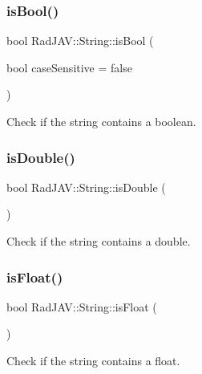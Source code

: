 \subsubsection{\texorpdfstring{is\+Bool()}{isBool()}}
{\footnotesize\ttfamily bool Rad\+J\+A\+V\+::\+String\+::is\+Bool (\begin{DoxyParamCaption}\item[{bool}]{case\+Sensitive = {\ttfamily false} }\end{DoxyParamCaption})}



Check if the string contains a boolean. 

\mbox{\label{class_rad_j_a_v_1_1_string_a51e463c671c993ce10184f68dac050d0}} 
\subsubsection{\texorpdfstring{is\+Double()}{isDouble()}}
{\footnotesize\ttfamily bool Rad\+J\+A\+V\+::\+String\+::is\+Double (\begin{DoxyParamCaption}{ }\end{DoxyParamCaption})}



Check if the string contains a double. 

\mbox{\label{class_rad_j_a_v_1_1_string_a3fdf5f2aef734fffa2d23964668641be}} 
\subsubsection{\texorpdfstring{is\+Float()}{isFloat()}}
{\footnotesize\ttfamily bool Rad\+J\+A\+V\+::\+String\+::is\+Float (\begin{DoxyParamCaption}{ }\end{DoxyParamCaption})}



Check if the string contains a float. 

\mbox{\label{class_rad_j_a_v_1_1_string_a8f4fec14c1752e3edb811a6e6f9c99ce}} 
